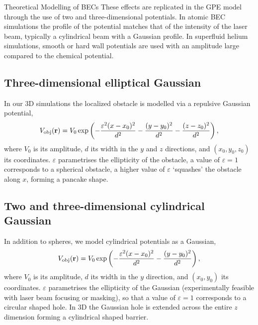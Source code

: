 \begin{chapter}{\label{cha:theoretical_model}Theoretical Modelling of BECs}
These effects are replicated in the GPE model through the use of two and three-dimensional potentials. In atomic BEC simulations the profile of the potential matches that of the intensity of the laser beam, typically a cylindrical beam with a Gaussian profile. In superfluid helium simulations, smooth or hard wall potentials are used with an amplitude large compared to the chemical potential.
\subsection{\label{section:3dobjpotential} Three-dimensional elliptical Gaussian}
In our 3D simulations the localized obstacle is modelled via a repulsive Gaussian potential,
\begin{equation}
V_{\mathrm{obj}}({\bf r})=V_0 \exp \left( -\frac{\varepsilon^2(x-x_0)^2}{d^2} -\frac{(y-y_0)^2}{d^2}-\frac{(z-z_0)^2}{d^2}\right),
\label{eq:potential3D}
\end{equation}
where  $V_0$ is its amplitude, $d$ its width in the $y$ and $z$ directions, and $(x_0,y_0,z_0)$ its coordinates. $\varepsilon$ parametrises the ellipticity of the obstacle, a value of $\varepsilon=1$ corresponds to a spherical obstacle, a higher value of $\varepsilon$ `squashes' the obstacle along $x$, forming a pancake shape.

\subsection{\label{section:3dcylinderpotential} Two and three-dimensional cylindrical Gaussian}
In addition to spheres, we model cylindrical potentials as a Gaussian,
\begin{equation}
V_{\mathrm{obj}}({\bf r})=V_0 \exp \left( -\frac{\varepsilon^2(x-x_0)^2}{d^2} -\frac{(y-y_0)^2}{d^2}\right),
\label{eq:potentialcylinder}
\end{equation}
where  $V_0$ is its amplitude, $d$ its width in the $y$ direction, and $(x_0,y_0)$ its coordinates. $\varepsilon$ parametrises the ellipticity of the Gaussian (experimentally feasible with laser beam focusing or masking), so that a value of $\varepsilon=1$ corresponds to a circular shaped hole. In 3D the Gaussian hole is extended across the entire $z$ dimension forming a cylindrical shaped barrier.

\end{chapter}
